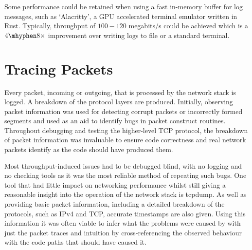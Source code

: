     Some performance could be retained when using a fast in-memory buffer for log messages, such as `Alacritty', a GPU accelerated terminal emulator written in Rust. Typically, throughput of $100 - 120$ megabits/s could be achieved which is a $4 \mhyphen 8 \times$ improvement over writing logs to file or a standard terminal.


    \section{Tracing Packets}
    Every packet, incoming or outgoing, that is processed by the network stack is logged. A breakdown of the protocol layers are produced. Initially, observing packet information was used for detecting corrupt packets or incorrectly formed segments and used as an aid to identify bugs in packet construct routines. Throughout debugging and testing the higher-level TCP protocol, the breakdown of packet information was invaluable to ensure code correctness and real network packets identify as the code should have produced them.

    Most throughput-induced issues had to be debugged blind, with no logging and no checking tools as it was the most reliable method of repeating such bugs. One tool that had little impact on networking performance whilst still giving a reasonable insight into the operation of the network stack is tcpdump. As well as providing basic packet information, including a detailed breakdown of the protocols, such as IPv4 and TCP, accurate timestamps are also given.
    Using this information it was often viable to infer what the problems were caused by with just the packet traces and intuition by cross-referencing the observed behaviour with the code paths that should have caused it.


